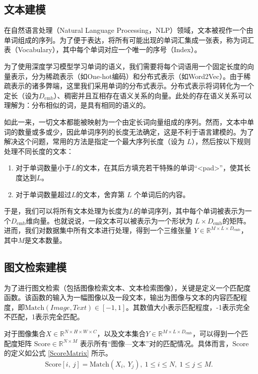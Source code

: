 \documentclass[a4paper]{zreport}
\begin{document}
\subsection{文本建模}

在自然语言处理（Natural Language Processing，NLP）领域，文本被视作一个由单词组成的序列。为了便于表达，将所有可能出现的单词汇集成一张表，称为词汇表（Vocabulary），其中每个单词对应一个唯一的序号（Index）。

为了使用深度学习模型学习单词的语义，我们需要将每个词语用一个固定长度的向量表示，分为稀疏表示（如One-hot编码）和分布式表示（如Word2Vec）。由于稀疏表示的诸多弊端，这里我们采用单词的分布式表示。分布式表示将词转化为一个定长（设为$D_\mathrm{emb}$）、稠密并且互相存在语义关系的向量。此处的存在语义关系可以理解为：分布相似的词，是具有相同的语义的。

如此一来，一切文本都能被映射为一个由定长词向量组成的序列。然而，文本中单词的数量或多或少，因此单词序列的长度无法确定，这是不利于语言建模的。为了解决这个问题，常用的方法是指定一个最大序列长度（设为 $L$），然后按以下规则处理不同长度的文本：

\begin{enumerate}
\item 对于单词数量小于$L$的文本，在其后方填充若干特殊的单词“<pad>”，使其长度达到$L$。
\item 对于单词数量超过$L$的文本，舍弃第 $L$ 个单词后的内容。
\end{enumerate}

于是，我们可以将所有文本处理为长度为$L$的单词序列，其中每个单词被表示为一个$D_\mathrm{emb}$维向量。也就说说，一段文本可以被表示为一个形状为 $L \times D_\mathrm{emb}$的矩阵。进而，我们对数据集中所有文本进行处理，得到一个三维张量 $Y \in \mathbb{R}^{M \times L \times D_\mathrm{emb}}$，其中$M$是文本数量。

\subsection{图文检索建模}

为了进行图文检索（包括图像检索文本、文本检索图像），关键是定义一个匹配度函数。该函数的输入为一幅图像以及一段文本，输出为图像与文本的内容匹配程度，即$\mathrm{Match}\left(Image, Text\right) \in \left[-1, 1\right]$。其数值大小表示匹配程度，-1表示完全不匹配，1表示完全匹配。

对于图像集合$X \in \mathbb{R}^{N \times H \times W \times C}$，以及文本集合$Y \in \mathbb{R}^{M \times L \times D_\mathrm{emb}}$，可以得到一个匹配度矩阵 $\mathrm{Score} \in \mathbb{R}^{N \times M}$ 表示所有“图像—文本”对的匹配情况。具体而言，$\mathrm{Score}$的定义如公式 \eqref{ScoreMatrix} 所示。
\begin{gather}
\mathrm{Score}\left[i,~j\right] = \mathrm{Match}\left(X_i,~Y_j\right),~1\le i \le N,~1\le j \le M.\label{ScoreMatrix}
\end{gather}
\end{document}
